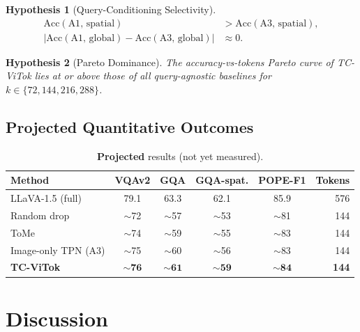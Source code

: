 \documentclass[11pt,a4paper]{article}
\newtheorem{hypothesis}{Hypothesis}
\begin{document}
\begin{hypothesis}[Query-Conditioning Selectivity]
  \label{hyp:main}
  \begin{align}
    \mathrm{Acc}(\text{A1},\,\text{spatial})
      &> \mathrm{Acc}(\text{A3},\,\text{spatial}), \\
    |\mathrm{Acc}(\text{A1},\,\text{global})
      - \mathrm{Acc}(\text{A3},\,\text{global})|
      &\approx 0.
  \end{align}
\end{hypothesis}

\begin{hypothesis}[Pareto Dominance]
  \label{hyp:pareto}
  The accuracy-vs-tokens Pareto curve of TC-ViTok lies at or above those
  of all query-agnostic baselines for $k \in \{72, 144, 216, 288\}$.
\end{hypothesis}

\subsection{Projected Quantitative Outcomes}

\begin{table}[h]
\centering
\caption{
  \textbf{Projected} results (not yet measured).
}
\label{tab:projected}
\renewcommand{\arraystretch}{1.2}
\small
\begin{tabular}{@{}lccccr@{}}
  \toprule
  Method & VQAv2 & GQA & GQA-spat. & POPE-F1 & Tokens \\
  \midrule
  LLaVA-1.5 (full)    & 79.1 & 63.3 & 62.1 & 85.9 & 576 \\
  Random drop          & $\sim$72 & $\sim$57 & $\sim$53 & $\sim$81 & 144 \\
  ToMe                 & $\sim$74 & $\sim$59 & $\sim$55 & $\sim$83 & 144 \\
  Image-only TPN (A3)  & $\sim$75 & $\sim$60 & $\sim$56 & $\sim$83 & 144 \\
  \textbf{TC-ViTok}    & $\mathbf{\sim\!76}$ & $\mathbf{\sim\!61}$
    & $\mathbf{\sim\!59}$ & $\mathbf{\sim\!84}$ & \textbf{144} \\
  \bottomrule
\end{tabular}
\end{table}

\section{Discussion}
\label{sec:discussion}
\end{document}
